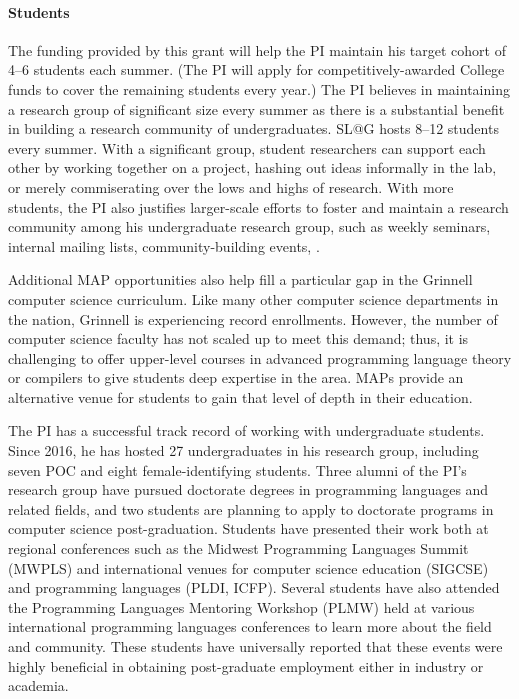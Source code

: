 \documentclass[11pt]{article}
\begin{document}
\paragraph{Students}

The funding provided by this grant will help the PI maintain his target cohort of 4--6 students each summer.
(The PI will apply for competitively-awarded College funds to cover the remaining students every year.)
The PI believes in maintaining a research group of significant size every summer as there is a substantial benefit in building a research community of undergraduates.
SL@G hosts 8--12 students every summer.
With a significant group, student researchers can support each other by working together on a project, hashing out ideas informally in the lab, or merely commiserating over the lows and highs of research.
With more students, the PI also justifies larger-scale efforts to foster and maintain a research community among his undergraduate research group, such as weekly seminars, internal mailing lists, community-building events, \etc.

Additional MAP opportunities also help fill a particular gap in the Grinnell computer science curriculum.
Like many other computer science departments in the nation, Grinnell is experiencing record enrollments.
However, the number of computer science faculty has not scaled up to meet this demand; thus, it is challenging to offer upper-level courses in advanced programming language theory or compilers to give students deep expertise in the area.
MAPs provide an alternative venue for students to gain that level of depth in their education.

The PI has a successful track record of working with undergraduate students.
Since 2016, he has hosted 27 undergraduates in his research group, including seven POC and eight female-identifying students.
Three alumni of the PI's research group have pursued doctorate degrees in programming languages and related fields, and two students are planning to apply to doctorate programs in computer science post-graduation.
Students have presented their work both at regional conferences such as the Midwest Programming Languages Summit (MWPLS) and international venues for computer science education (SIGCSE) and programming languages (PLDI, ICFP).
Several students have also attended the Programming Languages Mentoring Workshop (PLMW) held at various international programming languages conferences to learn more about the field and community.
These students have universally reported that these events were highly beneficial in obtaining post-graduate employment either in industry or academia.
\end{document}
